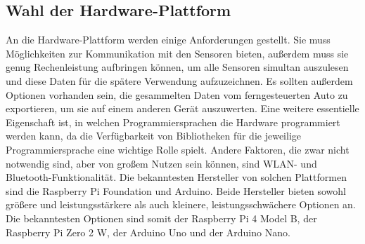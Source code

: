 \subsection{Wahl der Hardware-Plattform}
\label{subsec:elekMikrocontroller}
An die Hardware-Plattform werden einige Anforderungen gestellt. Sie muss Möglichkeiten zur Kommunikation mit den Sensoren bieten, außerdem muss sie genug Rechenleistung aufbringen können, um alle Sensoren simultan auszulesen und diese Daten für die spätere Verwendung aufzuzeichnen. Es sollten außerdem Optionen vorhanden sein, die gesammelten Daten vom ferngesteuerten Auto zu exportieren, um sie auf einem anderen Gerät auszuwerten. Eine weitere essentielle Eigenschaft ist, in welchen Programmiersprachen die Hardware programmiert werden kann, da die Verfügbarkeit von Bibliotheken für die jeweilige Programmiersprache eine wichtige Rolle spielt. Andere Faktoren, die zwar nicht notwendig sind, aber von großem Nutzen sein können, sind \ac{WLAN}- und Bluetooth-Funktionalität. Die bekanntesten Hersteller von solchen Plattformen sind die Raspberry Pi Foundation und Arduino.  Beide Hersteller bieten sowohl größere und leistungsstärkere als auch kleinere, leistungsschwächere Optionen an. Die bekanntesten Optionen sind somit der Raspberry Pi 4 Model B, der Raspberry Pi Zero 2 W, der Arduino Uno und der Arduino Nano.
